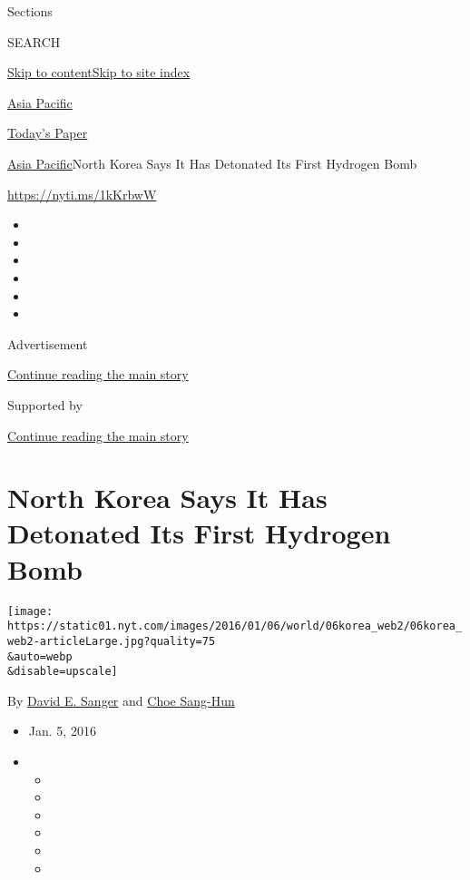 Sections

SEARCH

\protect\hyperlink{site-content}{Skip to
content}\protect\hyperlink{site-index}{Skip to site index}

\href{https://www.nytimes.com/section/world/asia}{Asia Pacific}

\href{https://myaccount.nytimes.com/auth/login?response_type=cookie\&client_id=vi}{}

\href{https://www.nytimes.com/section/todayspaper}{Today's Paper}

\href{/section/world/asia}{Asia Pacific}\textbar{}North Korea Says It
Has Detonated Its First Hydrogen Bomb

\url{https://nyti.ms/1kKrbwW}

\begin{itemize}
\item
\item
\item
\item
\item
\item
\end{itemize}

Advertisement

\protect\hyperlink{after-top}{Continue reading the main story}

Supported by

\protect\hyperlink{after-sponsor}{Continue reading the main story}

\hypertarget{north-korea-says-it-has-detonated-its-first-hydrogen-bomb}{%
\section{North Korea Says It Has Detonated Its First Hydrogen
Bomb}\label{north-korea-says-it-has-detonated-its-first-hydrogen-bomb}}

\texttt{[image: https://static01.nyt.com/images/2016/01/06/world/06korea\_web2/06korea\_web2-articleLarge.jpg?quality=75\\\&auto=webp\\\&disable=upscale]}

By \href{http://www.nytimes.com/by/david-e-sanger}{David E. Sanger} and
\href{http://www.nytimes.com/by/choe-sang-hun}{Choe Sang-Hun}

\begin{itemize}
\item
  Jan. 5, 2016
\item
  \begin{itemize}
  \item
  \item
  \item
  \item
  \item
  \item
  \end{itemize}
\end{itemize}

